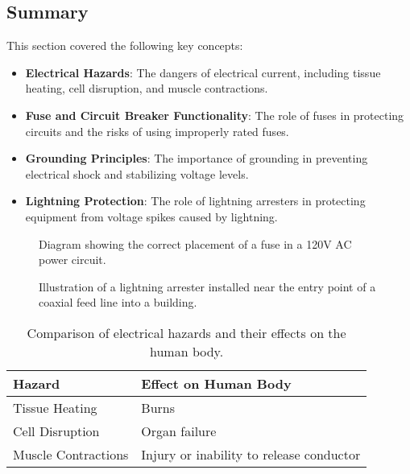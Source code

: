
\subsection*{Summary}
This section covered the following key concepts:
\begin{itemize}
    \item \textbf{Electrical Hazards}: The dangers of electrical current, including tissue heating, cell disruption, and muscle contractions.
    \item \textbf{Fuse and Circuit Breaker Functionality}: The role of fuses in protecting circuits and the risks of using improperly rated fuses.
    \item \textbf{Grounding Principles}: The importance of grounding in preventing electrical shock and stabilizing voltage levels.
    \item \textbf{Lightning Protection}: The role of lightning arresters in protecting equipment from voltage spikes caused by lightning.
\end{itemize}

\begin{figure}[h!]
    \centering
    \caption{Diagram showing the correct placement of a fuse in a 120V AC power circuit.}
    \label{fig:fuse_placement}
\end{figure}

\begin{figure}[h!]
    \centering
    \caption{Illustration of a lightning arrester installed near the entry point of a coaxial feed line into a building.}
    \label{fig:lightning_arrester}
\end{figure}

\begin{table}[h!]
    \centering
    \begin{tabular}{|l|l|}
        \hline
        \textbf{Hazard} & \textbf{Effect on Human Body} \\
        \hline
        Tissue Heating & Burns \\
        Cell Disruption & Organ failure \\
        Muscle Contractions & Injury or inability to release conductor \\
        \hline
    \end{tabular}
    \caption{Comparison of electrical hazards and their effects on the human body.}
    \label{tab:electrical_hazards}
\end{table}
